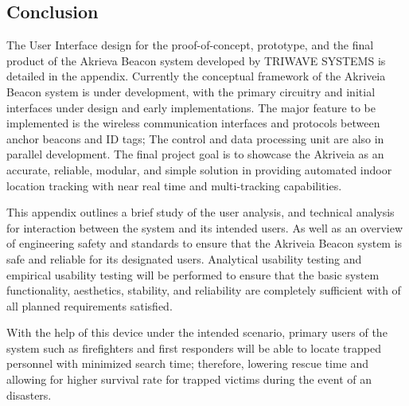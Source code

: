 

\subsection{Conclusion}

\bigskip
The User Interface design for the proof-of-concept, prototype, and the final product of the Akrieva Beacon system developed by TRIWAVE SYSTEMS is detailed in the appendix. Currently the conceptual framework of the Akriveia Beacon system is under development, with the primary circuitry and initial interfaces under design and early implementations. The major feature to be implemented is the wireless communication interfaces and protocols between anchor beacons and ID tags; The control and data processing unit are also in parallel development. The final project goal is to showcase the Akriveia as an accurate, reliable, modular, and simple solution in providing automated indoor location tracking with near real time and multi-tracking capabilities.  

\medskip
This appendix outlines a brief study of the user analysis, and technical analysis for interaction between the system and its intended users. As well as an overview of engineering safety and standards to ensure that the Akriveia Beacon system is safe and reliable for its designated users. Analytical usability testing and empirical usability testing will be performed to ensure that the basic system functionality, aesthetics, stability, and reliability are completely sufficient with of all planned requirements satisfied. 

\medskip
With the help of this device under the intended scenario, primary users of the system such as firefighters and first responders will be able to locate trapped personnel with minimized search time; therefore, lowering rescue time and allowing for higher survival rate for trapped victims during the event of an disasters. 













